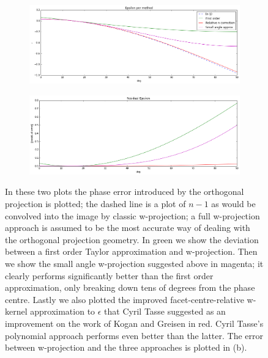 \begin{figure}[h]
  \begin{mdframed}
    \centering
    \begin{subfigure}[b]{0.7\textwidth}
      \centering
      \includegraphics[width=\textwidth]{images/coplanar_error.png}
      \caption{}
    \end{subfigure}  
    \begin{subfigure}[b]{0.7\textwidth}
      \centering
      \includegraphics[width=\textwidth]{images/coplanar_error_residuals.png}
      \caption{}
    \end{subfigure}
    \caption[Coplanar faceting error]{In these two plots the phase error introduced by the orthogonal projection is plotted; the dashed line is a plot of $n-1$ as
    would be convolved into the image by classic w-projection; a full w-projection approach is assumed to be the most accurate way of dealing with the orthogonal projection geometry.
    In green we show the deviation between a first order Taylor approximation and w-projection\cite{aipsfaceting}. Then we show the small angle w-projection
    suggested above in magenta; it clearly performs significantly better than the first order approximation, only breaking down tens of degrees from the phase centre. Lastly we also
    plotted the improved facet-centre-relative w-kernel approximation to $\epsilon$ that Cyril Tasse \cite{tassefaceting} suggested as an improvement on the work of 
    Kogan and Greisen \cite{aipsfaceting} in red. Cyril Tasse's polynomial approach \cite{tassefaceting} performs even better than the latter. The error between w-projection and the three
    approaches is plotted in (b).}
    \label{fig_error}
  \end{mdframed}
\end{figure}

